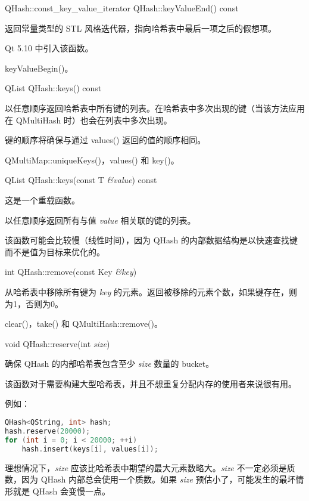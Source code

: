 QHash::const\_key\_value\_iterator QHash::keyValueEnd() const

返回常量类型的 STL 风格迭代器，指向哈希表中最后一项之后的假想项。

Qt 5.10 中引入该函数。


\begin{notice}[另请参阅]
keyValueBegin()。
\end{notice}


QList QHash::keys() const

以任意顺序返回哈希表中所有键的列表。在哈希表中多次出现的键（当该方法应用在 QMultiHash 时）也会在列表中多次出现。

键的顺序将确保与通过 values() 返回的值的顺序相同。


\begin{notice}[另请参阅]
QMultiMap::uniqueKeys()，values() 和 key()。
\end{notice}

QList QHash::keys(const T \emph{\&value}) const

这是一个重载函数。

以任意顺序返回所有与值 \emph{value} 相关联的键的列表。

该函数可能会比较慢（线性时间），因为 QHash 的内部数据结构是以快速查找键而不是值为目标来优化的。

int QHash::remove(const Key \emph{\&key})

从哈希表中移除所有键为 \emph{key} 的元素。返回被移除的元素个数，如果键存在，则为1，否则为0。


\begin{notice}[另请参阅]
clear()，take() 和 QMultiHash::remove()。
\end{notice}


void QHash::reserve(int \emph{size})

确保 QHash 的内部哈希表包含至少 \emph{size} 数量的 bucket。

该函数对于需要构建大型哈希表，并且不想重复分配内存的使用者来说很有用。

例如：

\begin{lstlisting}[language=C++]
QHash<QString, int> hash;
hash.reserve(20000);
for (int i = 0; i < 20000; ++i)
    hash.insert(keys[i], values[i]);
\end{lstlisting}

理想情况下，\emph{size} 应该比哈希表中期望的最大元素数略大。\emph{size} 不一定必须是质数，因为 QHash 内部总会使用一个质数。如果 \emph{size} 预估小了，可能发生的最坏情形就是 QHash 会变慢一点。

